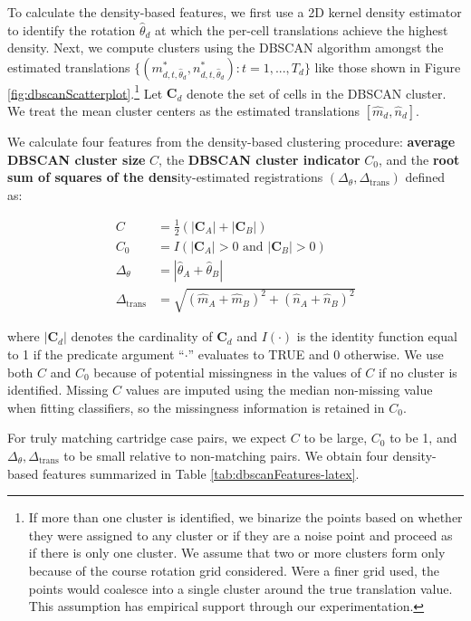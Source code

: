 \documentclass[11pt,]{isuthesis}
\let\rmarkdownfootnote\footnote%
\def\footnote{\protect\rmarkdownfootnote}
\begin{document}
To calculate the density-based features, we first use a 2D kernel density estimator \citep{MASS} to identify the rotation \(\hat{\theta}_d\) at which the per-cell translations achieve the highest density.
Next, we compute clusters using the DBSCAN algorithm amongst the estimated translations \(\{(m^*_{d,t,\hat{\theta}_d},n^*_{d,t,\hat{\theta}_d}) : t = 1,...,T_d\}\) like those shown in Figure \ref{fig:dbscanScatterplot}.\footnote{If more than one cluster is identified, we binarize the points based on whether they were assigned to any cluster or if they are a noise point and proceed as if there is only one cluster. We assume that two or more clusters form only because of the course rotation grid considered. Were a finer grid used, the points would coalesce into a single cluster around the true translation value. This assumption has empirical support through our experimentation.}
Let \(\pmb{C}_d\) denote the set of cells in the DBSCAN cluster.
We treat the mean cluster centers as the estimated translations \([\hat{m}_d,\hat{n}_d]\).

We calculate four features from the density-based clustering procedure: \textbf{average DBSCAN cluster size} \(C\), the \textbf{DBSCAN cluster indicator} \(C_0\), and the \textbf{root sum of squares of the dens}ity-estimated registrations \((\Delta_\theta, \Delta_{\text{trans}})\) defined as:

\begin{align*}
C &= \frac{1}{2}\left(|\pmb{C}_A| + |\pmb{C}_B|\right) \\
C_0 &= I(|\pmb{C}_A| > 0 \text{ and } |\pmb{C}_B| > 0)\\
\Delta_\theta &= |\hat{\theta}_A + \hat{\theta}_B| \\
\Delta_{\text{trans}} &= \sqrt{(\hat{m}_A + \hat{m}_B)^2 + (\hat{n}_A + \hat{n}_B)^2}
\end{align*}

where \(|\pmb{C}_d|\) denotes the cardinality of \(\pmb{C}_d\) and \(I(\cdot)\) is the identity function equal to 1 if the predicate argument ``\(\cdot\)'' evaluates to TRUE and 0 otherwise.
We use both \(C\) and \(C_0\) because of potential missingness in the values of \(C\) if no cluster is identified.
Missing \(C\) values are imputed using the median non-missing value when fitting classifiers, so the missingness information is retained in \(C_0\).

For truly matching cartridge case pairs, we expect \(C\) to be large, \(C_0\) to be 1, and \(\Delta_\theta, \Delta_{\text{trans}}\) to be small relative to non-matching pairs. We obtain four density-based features summarized in Table \ref{tab:dbscanFeatures-latex}.
\end{document}
